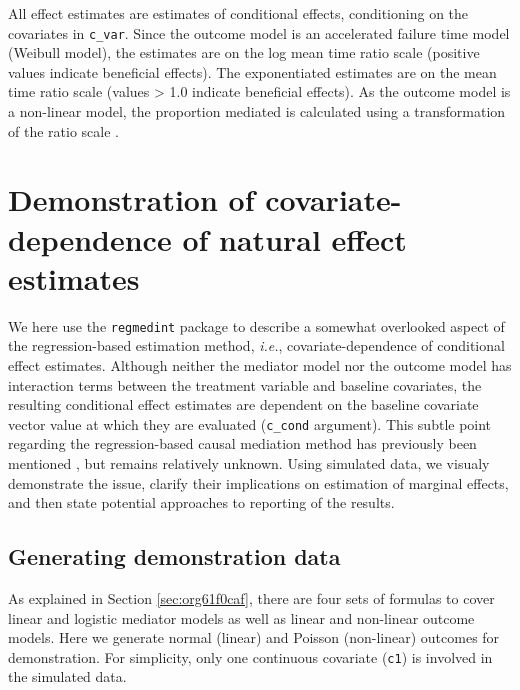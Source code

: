 \documentclass[dvipdfmx,10pt]{article}
\begin{document}
\normalsize

All effect estimates are estimates of conditional effects, conditioning on the covariates in \texttt{c\_var}. Since the outcome model is an accelerated failure time model (Weibull model), the estimates are on the log mean time ratio scale (positive values indicate beneficial effects). The exponentiated estimates are on the mean time ratio scale (values > 1.0 indicate beneficial effects). As the outcome model is a non-linear model, the proportion mediated is calculated using a transformation of the ratio scale \cite{vanderweeleOddsRatiosMediation2010}.

\section{Demonstration of covariate-dependence of natural effect estimates}
\label{sec:orga37579e}
We here use the \texttt{regmedint} package to describe a somewhat overlooked aspect of the regression-based estimation method, \textit{i.e.}, covariate-dependence of conditional effect estimates. Although neither the mediator model nor the outcome model has interaction terms between the treatment variable and baseline covariates, the resulting conditional effect estimates are dependent on the baseline covariate vector value at which they are evaluated (\texttt{c\_cond} argument). This subtle point regarding the regression-based causal mediation method has previously been mentioned \cite{steenFlexibleMediationAnalysis2017,starkopfComparisonFiveSoftware2017}, but remains relatively unknown. Using simulated data, we visualy demonstrate the issue, clarify their implications on estimation of marginal effects, and then state potential approaches to reporting of the results.

\subsection{Generating demonstration data}
\label{sec:orgd64e482}
As explained in Section \ref{sec:org61f0caf}, there are four sets of formulas to cover linear and logistic mediator models as well as linear and non-linear outcome models. Here we generate normal (linear) and Poisson (non-linear) outcomes for demonstration. For simplicity, only one continuous covariate (\texttt{c1}) is involved in the simulated data.
\end{document}
